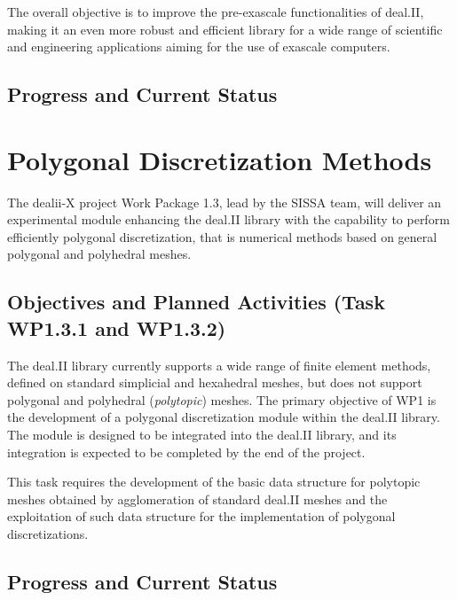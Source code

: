 \documentclass[a4paper,12pt]{article}
\begin{document}
The overall objective is to improve the pre-exascale functionalities of deal.II,
making it an even more robust and efficient library for a wide range of
scientific and engineering applications aiming for the use of exascale
computers.


\subsection{Progress and Current Status}



\section{Polygonal Discretization Methods}

 The dealii-X project Work Package 1.3, lead by the SISSA team, will deliver an experimental module enhancing the
deal.II library with the capability to perform efficiently polygonal discretization, that is numerical methods based on general polygonal and polyhedral meshes.%

\subsection{Objectives and Planned Activities (Task WP1.3.1 and WP1.3.2)}

The deal.II library currently
supports a wide range of finite element methods, defined on standard simplicial
and hexahedral meshes, but does not support polygonal and polyhedral (\emph{polytopic}) meshes.
The primary objective of WP1 is the development of a polygonal
discretization module within the deal.II library. The module is designed to be integrated into the deal.II library, and its integration is expected to be completed by the end of the project.

This task requires the development of the basic data structure for polytopic meshes obtained by agglomeration of standard deal.II meshes and the exploitation of such data structure for the implementation of polygonal discretizations.


 \subsection{Progress and Current Status}
\end{document}
